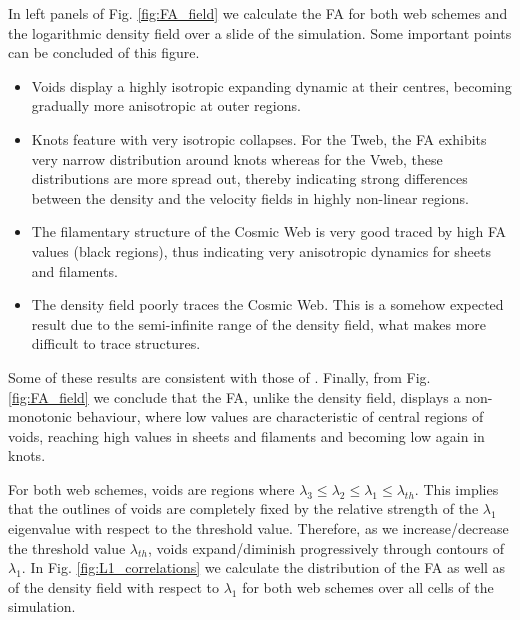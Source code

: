 \documentclass[a4,useAMS,usenatbib,usegraphicx]{latex/mn2e}
\begin{document}
In left panels of Fig. \ref{fig:FA_field} we calculate the FA for both 
web schemes and the logarithmic density field over a slide of the 
simulation. Some important points can be concluded of this figure.


\begin{itemize}
\item Voids display a highly isotropic expanding dynamic at their centres, 
becoming gradually more anisotropic at outer regions.
\item Knots feature with very isotropic collapses. For the Tweb, the FA 
exhibits very narrow distribution around knots whereas for the Vweb, these
distributions are more spread out, thereby indicating strong differences 
between the density and the velocity fields in highly non-linear regions.
\item The filamentary structure of the Cosmic Web is very good traced by
high FA values (black regions), thus indicating very anisotropic dynamics 
for sheets and filaments.
\item The density field poorly traces the Cosmic Web. This is a somehow 
expected result due to the semi-infinite range of the density field, what 
makes more difficult to trace structures.
\end{itemize}


Some of these results are consistent with those of \citet{Libeskind13}.
Finally, from Fig. \ref{fig:FA_field} we conclude that the FA, unlike the
density field, displays a non-monotonic behaviour, where low values are 
characteristic of central regions of voids, reaching high values in sheets
and filaments and becoming low again in knots. 


For both web schemes, voids are regions where $\lambda_3\leq\lambda_2\leq
\lambda_1\leq\lambda_{th}$. This implies that the outlines of voids
are completely fixed by the relative strength of the $\lambda_1$ 
eigenvalue with respect to the threshold value. Therefore, as we 
increase/decrease the threshold value $\lambda_{th}$, voids expand/diminish
progressively through contours of $\lambda_1$. In Fig. 
\ref{fig:L1_correlations} we calculate the distribution of the FA as well
as of the density field with respect to $\lambda_1$ for both web schemes 
over all cells of the simulation.
\end{document}
